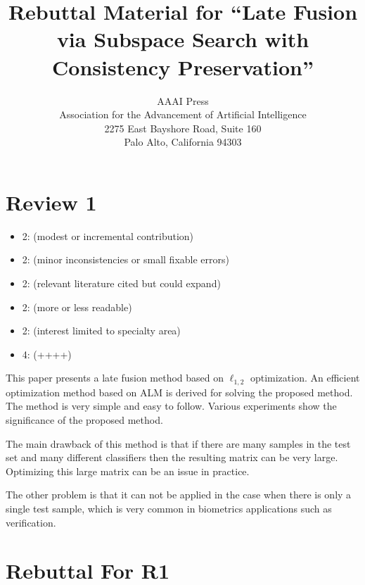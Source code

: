 \documentclass[letterpaper]{article}
\begin{document}
%



\title{Rebuttal Material 
for ``Late Fusion via Subspace Search with Consistency Preservation''}

\author{AAAI Press\\
Association for the Advancement of Artificial Intelligence\\
2275 East Bayshore Road, Suite 160\\
Palo Alto, California 94303\\
}

\maketitle

\section{Review 1}
\begin{itemize}
  \item 2: (modest or incremental contribution)
  \item 2: (minor inconsistencies or small fixable errors) 
  \item 2: (relevant literature cited but could expand)
  \item 2: (more or less readable)
  \item 2: (interest limited to specialty area) 
  \item 4: (++++)
\end{itemize}

This paper presents a late fusion method based on $\ell_{1, 2}$ optimization. An efficient optimization method based on ALM is derived for solving the proposed method. The method is very simple and easy to follow. Various experiments show the significance of the proposed method.

The main drawback of this method is that if there are many samples in the test set and many different classifiers then the resulting matrix can be very large. Optimizing this large matrix can be an issue in practice.

The other problem is that it can not be applied in the case when there is only a single test sample, which is very common in biometrics applications such as verification.

\section{Rebuttal For R1}
\end{document}
